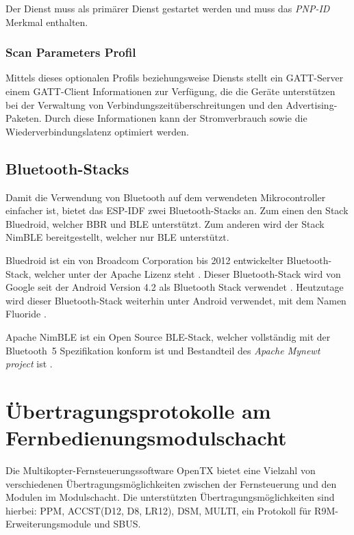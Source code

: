 Der Dienst muss als primärer Dienst gestartet werden und muss das \textit{PNP-ID} Merkmal enthalten. \cite[S.~14f.]{bluetoothHOGP}

\subsubsection{Scan Parameters Profil}
Mittels dieses optionalen Profils beziehungsweise Diensts stellt ein \acs{GATT}-Server einem \acs{GATT}-Client Informationen zur Verfügung, die die Geräte unterstützen bei der Verwaltung von Verbindungszeitüberschreitungen und den Advertising-Paketen. Durch diese Informationen kann der Stromverbrauch sowie die Wiederverbindungslatenz optimiert werden. \cite[S.~6]{bluetoothScan}

\subsection{Bluetooth-Stacks}
\label{section:bluetoothStacks}

Damit die Verwendung von Bluetooth auf dem verwendeten Mikrocontroller einfacher ist, bietet das \ac{ESP-IDF} zwei Bluetooth-Stacks an. Zum einen den Stack Bluedroid, welcher \ac{BBR} und \ac{BLE} unterstützt. Zum anderen wird der Stack NimBLE bereitgestellt, welcher nur \ac{BLE} unterstützt. \cite{espidfBluetoothStack}

Bluedroid ist ein von Broadcom Corporation bis 2012 entwickelter Bluetooth-Stack, welcher unter der Apache Lizenz steht \cite{bluedroidlizenz}. Dieser Bluetooth-Stack wird von Google seit der Android Version 4.2 als Bluetooth Stack verwendet \cite{lwnBluedroid}. Heutzutage wird dieser Bluetooth-Stack weiterhin unter Android verwendet, mit dem Namen Fluoride \cites{aospFluoride}{anachaoFluoride}.

Apache NimBLE ist ein Open Source \ac{BLE}-Stack, welcher vollständig mit der Bluetooth~5 Spezifikation konform ist \cite{docnimble} und Bestandteil des \textit{Apache Mynewt project} ist \cite{gitnimble}.


\section{Übertragungsprotokolle am Fernbedienungsmodulschacht}

Die Multikopter-Fernsteuerungssoftware OpenTX bietet eine Vielzahl von verschiedenen Übertragungsmöglichkeiten zwischen der Fernsteuerung und den Modulen im Modulschacht. Die unterstützten Übertragungsmöglichkeiten sind hierbei: \ac{PPM}, ACCST(D12, D8, LR12)\cite{liangRCProtocols}, DSM, MULTI, ein Protokoll für R9M-Erweiterungsmodule \cite{frskyr9m} und SBUS. \cite{opentxsetup}

